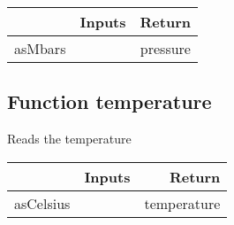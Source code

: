 \documentclass[a4paper,12pt,oneside,pdflatex,italian,final,twocolumn]{article}
\begin{document}
\centering
\begin{tabular}{lcr}
\toprule
  & Inputs & Return \\
\midrule
asMbars &
&
pressure
\\
\bottomrule
\end{tabular}



\raggedright
\subsection{Function temperature }
Reads the temperature \\

\centering
\begin{tabular}{lcr}
\toprule
  & Inputs & Return \\
\midrule
asCelsius &
&
temperature
\\
\bottomrule
\end{tabular}



\raggedright
\end{document}
